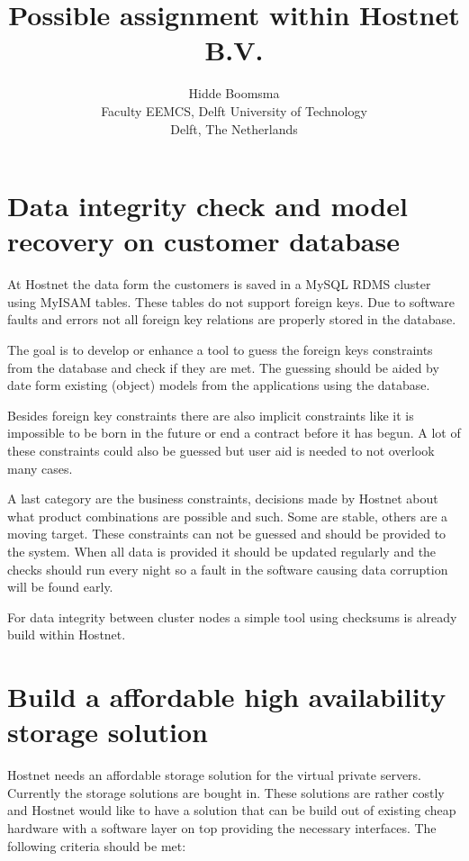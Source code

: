 \documentclass[a4paper,10pt]{article}
\title{Possible assignment within Hostnet B.V.}
\author{Hidde Boomsma \\ Faculty EEMCS, Delft University of Technology \\ Delft, The Netherlands}
\begin{document}
\maketitle


\section{Data integrity check and model recovery on customer database}

At Hostnet the data form the customers is saved in a MySQL RDMS cluster using MyISAM tables. These tables do not support foreign keys. Due to software faults and errors not all foreign key relations are properly stored in the database. 

The goal is to develop or enhance a tool to guess the foreign keys constraints from the database and check if they are met. The guessing should be aided by date form existing (object) models from the applications using the database.

Besides foreign key constraints there are also implicit constraints like it is impossible to be born in the future or end a contract before it has begun. A lot of these constraints could also be guessed but user aid is needed to not overlook many cases.

A last category are the business constraints, decisions made by Hostnet about what product combinations are possible and such. Some are stable, others are a moving target. These constraints can not be guessed and should be provided to the system.
When all data is provided it should be updated regularly and the checks should run every night so a fault in the software causing data corruption will be found early.

For data integrity between cluster nodes a simple tool using checksums is already build within Hostnet.

\section{Build a affordable high availability storage solution}
Hostnet needs an affordable storage solution for the virtual private servers. Currently the storage solutions are bought in. These solutions are rather costly and Hostnet would like to have a solution that can be build out of existing cheap hardware with a software layer on top providing the necessary interfaces. The following criteria should be met:
\end{document}

